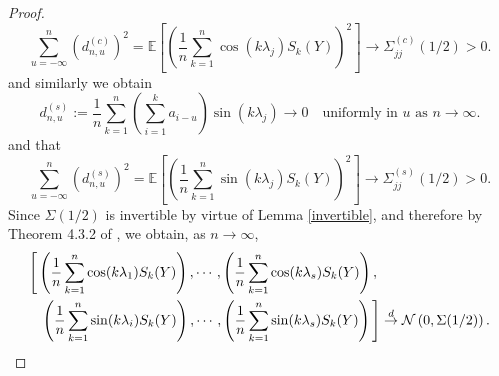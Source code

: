 \documentclass[10pt,a4paper]{amsart}
\numberwithin{equation}{section}
\begin{document}
\begin{proof}
$$
\sum_{u=-\infty}^n\left(d^{(c)}_{n,u}\right)^2=\mathbb{E}\left[\left(\frac{1}{n}\sum_{k=1}^n\cos(k\lambda_{j})S_k(Y)\right)^2\right]\to\Sigma^{(c)}_{jj}(1/2)>0.
$$
and similarly we obtain 
$$
d^{(s)}_{n,u}:=\frac{1}{n}\sum_{k=1}^n\left(\sum_{i=1}^ka_{i-u}\right)\sin(k\lambda_j)\to0\quad\textrm{uniformly in }u\textrm{ as }n\to\infty.
$$
and that
$$
\sum_{u=-\infty}^n\left(d^{(s)}_{n,u}\right)^2=\mathbb{E}\left[\left(\frac{1}{n}\sum_{k=1}^n\sin(k\lambda_{j})S_k(Y)\right)^2\right]\to\Sigma^{(s)}_{jj}(1/2)>0.
$$
Since $\Sigma(1/2)$ is invertible by virtue of Lemma \ref{invertible}, and therefore by Theorem 4.3.2 of \cite{MR2977317},  we obtain, as $n\to\infty$,
\begin{eqnarray*}\lefteqn{
\Bigg[\left(\frac{1}{n}\sum_{k=1}^n\cos(k\lambda_{1})S_k(Y)\right),
\cdots,\left(\frac{1}{n}\sum_{k=1}^n\cos(k\lambda_{s})S_k(Y)\right),}\\
&& \left(\frac{1}{n}\sum_{k=1}^n\sin(k\lambda_{i})S_k(Y)\right),\cdots,\left(\frac{1}{n}\sum_{k=1}^n\sin(k\lambda_{s})S_k(Y)\right)\Bigg]\overset{d}{\rightarrow}\mathcal{N}\left(0,\Sigma(1/2)\right). 
\end{eqnarray*}


\end{proof}
\end{document}
